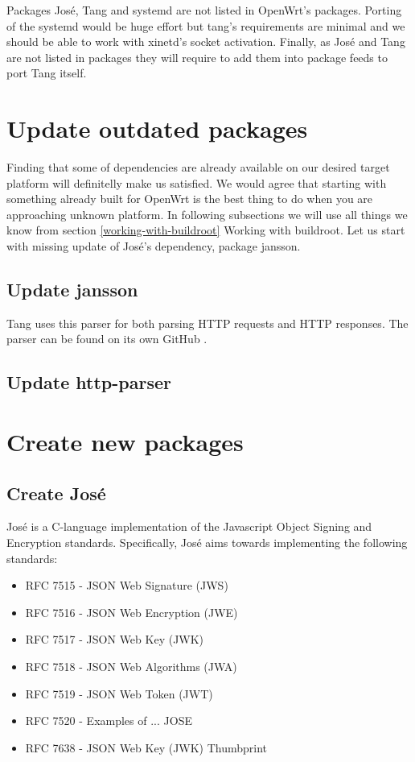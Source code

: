 Packages José, Tang and systemd are not listed in OpenWrt's packages.
Porting of the systemd would be huge effort but tang's requirements are minimal and we should be able to work with xinetd's socket activation.
Finally, as José and Tang are not listed in packages they will require to add them into package feeds to port Tang itself.

\section{Update outdated packages}

Finding that some of dependencies are already available on our desired target platform will definitelly make us satisfied.
We would agree that starting with something already built for OpenWrt is the best thing to do when you are approaching unknown platform.
In following subsections we will use all things we know from section \ref{working-with-buildroot} Working with buildroot.
Let us start with missing update of José's dependency, package jansson.

\subsection{Update jansson}\label{jansson}
Tang uses this parser for both parsing HTTP requests and HTTP responses.
The parser can be found on its own GitHub \cite{http-parser}.
\newpage

\subsection{Update http-parser}\label{http-parser}

\newpage

\section{Create new packages}

\newpage

\subsection{Create José}\label{jose}
José \cite{jose_prog} is a C-language implementation of the Javascript Object Signing and Encryption standards.
Specifically, José aims towards implementing the following standards:
\begin{itemize}
   \item RFC 7515 - JSON Web Signature (JWS)        \cite{RFC7515}
   \item RFC 7516 - JSON Web Encryption (JWE)       \cite{RFC7516}
   \item RFC 7517 - JSON Web Key (JWK)              \cite{RFC7517}
   \item RFC 7518 - JSON Web Algorithms (JWA)       \cite{RFC7518}
   \item RFC 7519 - JSON Web Token (JWT)            \cite{RFC7519}
   \item RFC 7520 - Examples of ... JOSE            \cite{RFC7520}
   \item RFC 7638 - JSON Web Key (JWK) Thumbprint   \cite{RFC7638}
\end{itemize}

